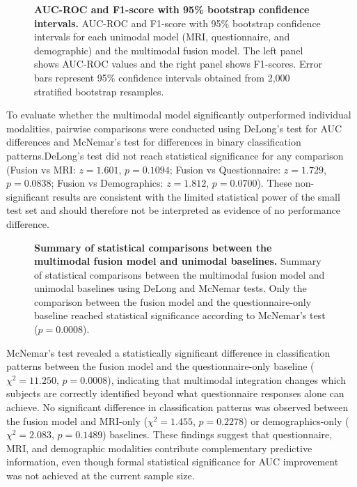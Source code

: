 \documentclass[10pt,letterpaper]{article}
\begin{document}
\begin{figure}[!h]
\caption{\textbf{AUC-ROC and F1-score with 95\% bootstrap confidence intervals.}
AUC-ROC and F1-score with 95\% bootstrap confidence intervals for each unimodal model (MRI, questionnaire, and demographic) and the multimodal fusion model. The left panel shows AUC-ROC values and the right panel shows F1-scores. Error bars represent 95\% confidence intervals obtained from 2,000 stratified bootstrap resamples.}
\label{fig:ci_barplot}
\end{figure}

To evaluate whether the multimodal model significantly outperformed
individual modalities, pairwise comparisons were conducted using
DeLong's test for AUC differences and McNemar's test for differences
in binary classification patterns.DeLong's test did not reach statistical significance for any comparison (Fusion vs MRI: $z = 1.601$, $p = 0.1094$; Fusion vs Questionnaire:
$z = 1.729$, $p = 0.0838$; Fusion vs Demographics: $z = 1.812$,
$p = 0.0700$). These non-significant results are consistent with the
limited statistical power of the small test set and should therefore
not be interpreted as evidence of no performance difference.

\begin{figure}[!h]
\caption{\textbf{Summary of statistical comparisons between the multimodal fusion model and unimodal baselines.}
Summary of statistical comparisons between the multimodal fusion model and unimodal baselines using DeLong and McNemar tests. Only the comparison between the fusion model and the questionnaire-only baseline reached statistical significance according to McNemar's test ($p = 0.0008$).}
\label{fig:stat_tests}
\end{figure}

McNemar's test revealed a statistically significant difference in
classification patterns between the fusion model and the
questionnaire-only baseline ($\chi^2 = 11.250$, $p = 0.0008$),
indicating that multimodal integration changes which subjects are
correctly identified beyond what questionnaire responses alone can
achieve. No significant difference in classification patterns was
observed between the fusion model and MRI-only ($\chi^2 = 1.455$,
$p = 0.2278$) or demographics-only ($\chi^2 = 2.083$, $p = 0.1489$)
baselines. These findings suggest that questionnaire, MRI, and
demographic modalities contribute complementary predictive information,
even though formal statistical significance for AUC improvement was
not achieved at the current sample size.
\end{document}
